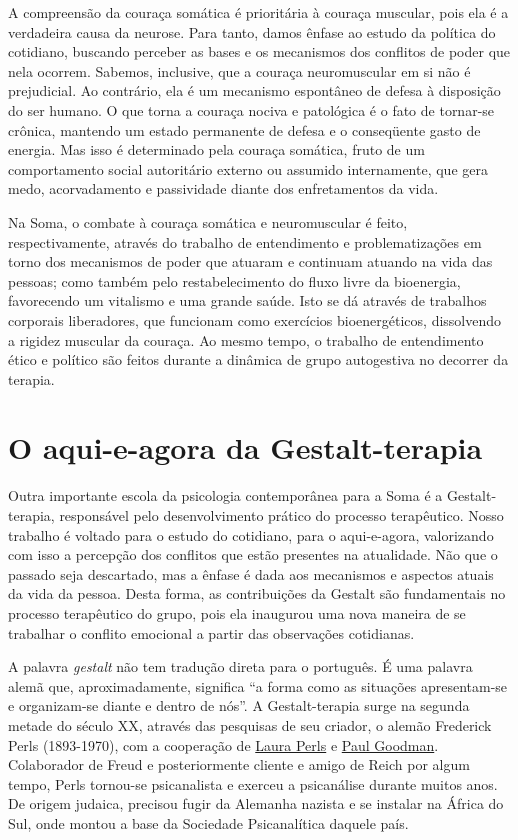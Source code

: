 A compreensão da couraça somática é prioritária à couraça muscular, pois
ela é a verdadeira causa da neurose. Para tanto, damos ênfase ao estudo
da política do cotidiano, buscando perceber as bases e os mecanismos dos
conflitos de poder que nela ocorrem. Sabemos, inclusive, que a couraça
neuromuscular em si não é prejudicial. Ao contrário, ela é um mecanismo
espontâneo de defesa à disposição do ser humano. O que torna a couraça
nociva e patológica é o fato de tornar-se crônica, mantendo um estado
permanente de defesa e o conseqüente gasto de energia. Mas isso é
determinado pela couraça somática, fruto de um comportamento social
autoritário externo ou assumido internamente, que gera medo,
acorvadamento e passividade diante dos enfretamentos da vida.

Na Soma, o combate à couraça somática e neuromuscular é feito,
respectivamente, através do trabalho de entendimento e problematizações
em torno dos mecanismos de poder que atuaram e continuam atuando na vida
das pessoas; como também pelo restabelecimento do fluxo livre da
bioenergia, favorecendo um vitalismo e uma grande saúde. Isto se dá
através de trabalhos corporais liberadores, que funcionam como
exercícios bioenergéticos, dissolvendo a rigidez muscular da couraça. Ao
mesmo tempo, o trabalho de entendimento ético e político são feitos
durante a dinâmica de grupo autogestiva no decorrer da terapia.

\section{O aqui-e-agora da Gestalt-terapia}

Outra importante escola da psicologia contemporânea para a Soma é a
Gestalt-terapia, responsável pelo desenvolvimento prático do processo
terapêutico. Nosso trabalho é voltado para o estudo do cotidiano, para o
aqui-e-agora, valorizando com isso a percepção dos conflitos que estão
presentes na atualidade. Não que o passado seja descartado, mas a ênfase
é dada aos mecanismos e aspectos atuais da vida da pessoa. Desta forma,
as contribuições da Gestalt são fundamentais no processo terapêutico do
grupo, pois ela inaugurou uma nova maneira de se trabalhar o conflito
emocional a partir das observações cotidianas.

A palavra \emph{gestalt} não tem tradução direta para o português. É uma
palavra alemã que, aproximadamente, significa ``a forma como as
situações apresentam-se e organizam-se diante e dentro de nós''. A
Gestalt-terapia surge na segunda metade do século XX, através das
pesquisas de seu criador, o alemão Frederick Perls (1893-1970), com a
cooperação de
\href{http://pt.wikipedia.org/w/index.php?title=Laura_Perls\&action=edit\&redlink=1}{Laura
Perls} e
\href{http://pt.wikipedia.org/w/index.php?title=Paul_Goodman\&action=edit\&redlink=1}{Paul
Goodman}. Colaborador de Freud e posteriormente cliente e amigo de Reich
por algum tempo, Perls tornou-se psicanalista e exerceu a psicanálise
durante muitos anos. De origem judaica, precisou fugir da Alemanha
nazista e se instalar na África do Sul, onde montou a base da Sociedade
Psicanalítica daquele país.

